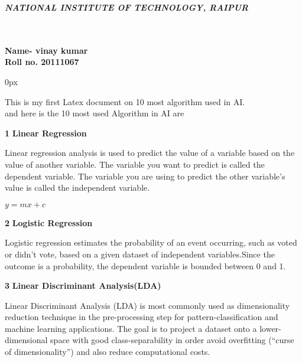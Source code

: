 \documentclass[12pt]{article}
\begin{document}
\textbf{\textit{NATIONAL INSTITUTE OF TECHNOLOGY, RAIPUR}}
\\
\\
\\
\begin{flushleft}
\textbf{Name- vinay kumar\\ Roll no. 20111067}\\
\end{flushleft}
\parindent 0px
\begin{footnotesize}
\begin{LARGE}
This is my first Latex document on 10 most algorithm used in AI.\\
and here is the 10 most used Algorithm in AI are\\
\end{LARGE}

\end{footnotesize}
\textbf{1} \textbf{Linear Regression}\\
   \begin{center}
    \begin{flushleft}
Linear regression analysis is used to predict the value of a variable based on the value of another variable. The variable you want to predict is called the dependent variable. The variable you are using to predict the other variable's value is called the independent variable.\\
\begin{center}
 $ y=mx+c $
\end{center}
    \end{flushleft}
   \end{center}
\textbf{2} \textbf{Logistic Regression\\}
\begin{center}
\begin{flushleft}
 Logistic regression estimates the probability of an event occurring, such as voted or didn’t vote, based on a given dataset of independent variables.Since the outcome is a probability, the dependent variable is bounded between 0 and 1.
\end{flushleft}
\end{center}
\textbf{3} \textbf{Linear Discriminant Analysis(LDA)}
\begin{center}
\begin{flushleft}
Linear Discriminant Analysis (LDA) is most commonly used as dimensionality reduction technique in the pre-processing step for pattern-classification and machine learning applications. The goal is to project a dataset onto a lower-dimensional space with good class-separability in order avoid overfitting (“curse of dimensionality”) and also reduce computational costs.
\end{flushleft}
\end{center}
\end{document}
